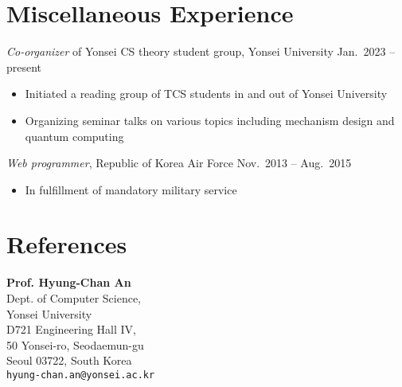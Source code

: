 \documentclass{article}
\newcommand{\killinitspace}{-0.7em}
\begin{document}
\section{Miscellaneous Experience}
\textsl{Co-organizer} of Yonsei CS theory student group, Yonsei University \hfill Jan.~2023 -- present
\vspace{\killinitspace}
\begin{itemize}
\item Initiated a reading group of TCS students in and out of Yonsei University
\item Organizing seminar talks on various topics including mechanism design and quantum computing
\end{itemize}

\textsl{Web programmer}, Republic of Korea Air Force \hfill Nov.~2013 -- Aug.~2015
\vspace{\killinitspace}
\begin{itemize}
\item In fulfillment of mandatory military service
\end{itemize}

\section{References}
\parbox{0.333\textwidth}{
\textbf{Prof. Hyung-Chan An}\\
Dept. of Computer Science, \\
Yonsei University \\
D721 Engineering Hall IV, \\
50 Yonsei-ro, Seodaemun-gu \\
Seoul 03722, South Korea\\
\texttt{hyung-chan.an@yonsei.ac.kr}
}
\end{document}
